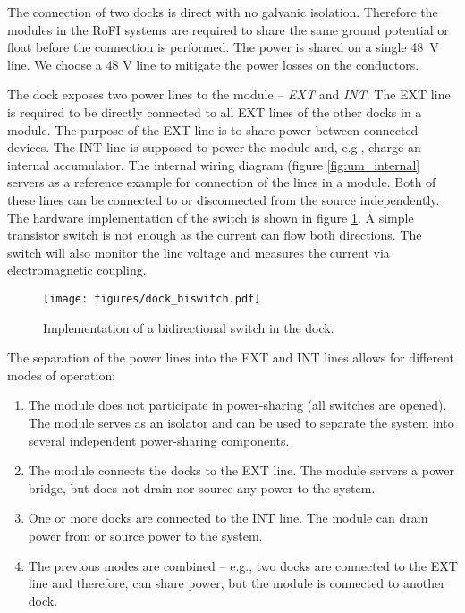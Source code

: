 The connection of two docks is direct with no galvanic isolation. Therefore the
modules in the RoFI systems are required to share the same ground potential or
float before the connection is performed. The power is shared on a single 48~V
line. We choose a 48 V line to mitigate the power losses on the conductors.

The dock exposes two power lines to the module -- \emph{EXT} and \emph{INT}. The
EXT line is required to be directly connected to all EXT lines of the other
docks in a module. The purpose of the EXT line is to share power between
connected devices. The INT line is supposed to power the module and, e.g.,
charge an internal accumulator. The internal wiring diagram (figure
\ref{fig:um_internal} servers as a reference example for connection of the lines
in a module. Both of these lines can be connected to or disconnected from the
source independently. The hardware implementation of the switch is shown in
figure \ref{fig:dock_biswitch}. A simple transistor switch is not enough as the
current can flow both directions. The switch will also monitor the line voltage
and measures the current via electromagnetic coupling.

\begin{figure}[t]
    \centering
    \texttt{[image: figures/dock\_biswitch.pdf]}
    \caption{Implementation of a bidirectional switch in the dock.}
    \label{fig:dock_biswitch}
\end{figure}

The separation of the power lines into the EXT and INT lines allows for
different modes of operation:
\begin{enumerate}
    \item The module does not participate in power-sharing (all switches are
    opened). The module serves as an isolator and can be used to separate
    the system into several independent power-sharing components.
    \item The module connects the docks to the EXT line. The module servers a
    power bridge, but does not drain nor source any power to the system.
    \item One or more docks are connected to the INT line. The module can drain
    power from or source power to the system.
    \item The previous modes are combined -- e.g., two docks are connected to the
    EXT line and therefore, can share power, but the module is connected to
    another dock.
\end{enumerate}

